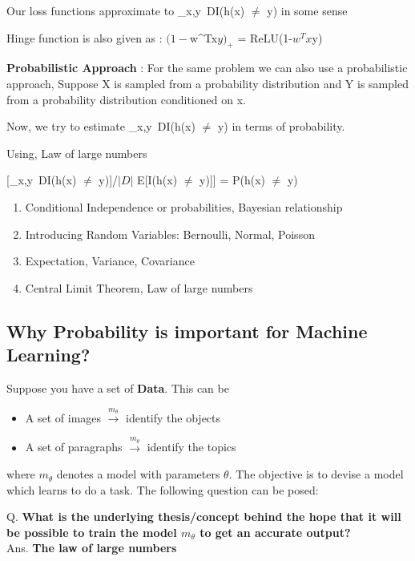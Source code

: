 \documentclass[11pt, twosides]{article}
\begin{document}
Our loss functions approximate to \sum_{x,y\in\ D}I(h(x) $\not=$ y) in some sense

Hinge function is also given as :
$(1-$w^Tx$y)_+$ = ReLU(1-$w^Tx$y)


\textbf{Probabilistic Approach} :
For the same problem we can also use a probabilistic approach, Suppose X is sampled from a probability distribution and Y is sampled from a probability distribution conditioned on x.

Now, we try to estimate \sum_{x,y\in\ D}I(h(x) $\not=$ y) in terms of probability.

Using, Law of large numbers

[\sum_{x,y\in\ D}I(h(x) $\not=$ y)]/$|D|$ \approx E[I(h(x) $\not=$ y)]] = P(h(x) $\not=$ y)
\begin{enumerate}
    \item Conditional Independence or probabilities, Bayesian relationship
    \item Introducing Random Variables: Bernoulli, Normal, Poisson
    \item Expectation, Variance, Covariance
    \item Central Limit Theorem, Law of large numbers
\end{enumerate}

\subsection{Why Probability is important for Machine Learning?}
Suppose you have a set of \textbf{Data}. This can be
\begin{itemize}
    \item A set of images $\xrightarrow{m_\theta}$ identify the objects
    \item A set of paragraphs $\xrightarrow{m_\theta}$ identify the topics 
\end{itemize}
where $m_\theta$ denotes a model with parameters $\theta$. The objective is to devise a model which learns to do a task. The following question can be posed:
\begin{flushleft}
Q. \textbf{What is the underlying thesis/concept behind the hope that it will be possible to train the model $m_\theta$ to get an accurate output?}\\

Ans. \color{blue}
\textbf{The law of large numbers}
\end{flushleft}
\end{document}
